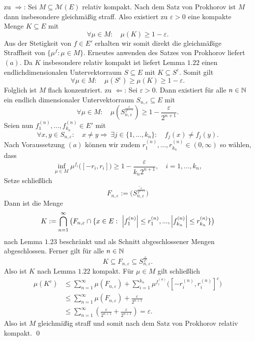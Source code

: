 \begin{proof*}
    zu $\Rightarrow$: 
    Sei $M \subseteq \mathcal{M}(E)$ relativ kompakt. Nach dem Satz von Prokhorov ist $M$ dann insbesondere gleichmäßig straff. 
    Also existiert zu $\varepsilon > 0$ eine kompakte Menge $K \subseteq E$ mit 
    $$
        \forall \mu \in M: \quad \mu(K) \geq 1 - \varepsilon.   
    $$ 
    Aus der Stetigkeit von $f \in E'$ erhalten wir somit direkt die gleichmäßige Straffheit von \mbox{$\{\mu^f : \mu \in M\}$}. Erneutes anwenden des Satzes von Prokhorov liefert $(a)$. 
    Da $K$ insbesondere relativ kompakt ist liefert Lemma $1.22$ einen endlichdimensionalen Untervektorraum $S \subseteq E$ mit $K \subseteq S^{\varepsilon}$. Somit gilt
    $$
        \forall \mu \in M: \quad \mu(S^{\varepsilon}) \geq \mu(K) \geq 1 - \varepsilon.
    $$
    Folglich ist $M$ flach konzentriert. 
    \newline 
    zu $\Leftarrow$: 
    Sei $\varepsilon > 0$. Dann existiert für alle $n \in \mathbb{N}$ ein endlich dimensionaler Untervektorraum $S_{n, \varepsilon} \subseteq E$ mit 
    $$
        \forall \mu \in M: \quad \mu(S_{n, \varepsilon}^{\frac{\varepsilon}{2^{n+1}}}) \geq 1 - \frac{\varepsilon}{2^{n+1}}.
    $$
    Seien nun $f_1^{(n)},...,f_{k_n}^{(n)} \in E'$ mit 
    $$
        \forall x,y \in S_{n, \varepsilon}: \quad x \neq y \Rightarrow \ \exists j \in \{1,...,k_n\}: \quad f_j(x) \neq f_j(y). 
    $$
    Nach Voraussetzung $(a)$ können wir zudem $r_1^{(n)},...,r_{k_n}^{(n)} \in (0, \infty)$ so wählen, dass
    $$
        \inf_{\mu \in M} \mu^{f_i}\big([-r_i, r_i]\big) \geq 1 - \frac{\varepsilon}{k_n 2^{n+1}}, \quad i=1,...,k_n,
    $$
    Setze schließlich
    $$
        F_{n,\varepsilon} := \overline{\big(S_{n,\varepsilon}^{\frac{\varepsilon}{2^{n+1}}}\big)}
    $$
    Dann ist die Menge 
    $$
        K := \bigcap_{n =1}^{\infty}\big(F_{n, \varepsilon} \cap\{x \in E: \ \left| f_1^{(n)} \right|\leq r_1^{(n)},...,\left| f_{k_n}^{(n)} \right|\leq r_{k_n}^{(n)}\}\big)
    $$
    nach Lemma $1.23$ beschränkt und als Schnitt abgeschlossener Mengen abgeschlossen. Ferner gilt für alle $n \in \mathbb{N}$
    $$
        K \subseteq  F_{n, \varepsilon} \subseteq S_{n,\varepsilon}^{\frac{\varepsilon}{2^n}}.
    $$
    Also ist $K$ nach Lemma $1.22$ kompakt. Für $\mu \in M$ gilt schließlich
    \begin{align*}
        \mu(K^c) &\leq \sum_{n=1}^{\infty}\mu(F_{n, \varepsilon}) + \sum_{i=1}^{k_n}\mu^{f_i^{(n)}}\big([-r_i^{(n)}, r_i^{(n)}]^c\big) \\\
                 &\leq \sum_{n=1}^{\infty}\mu(F_{n, \varepsilon}) + \frac{\varepsilon}{2^{n+1}} \\\
                 &\leq \sum_{n=1}^{\infty}(\frac{\varepsilon}{2^{n+1}} + \frac{\varepsilon}{2^{n+1}}) = \varepsilon. 
    \end{align*}
    Also ist $M$ gleichmäßig straff und somit nach dem Satz von Prokhorov relativ kompakt. \qed
\end{proof*}

